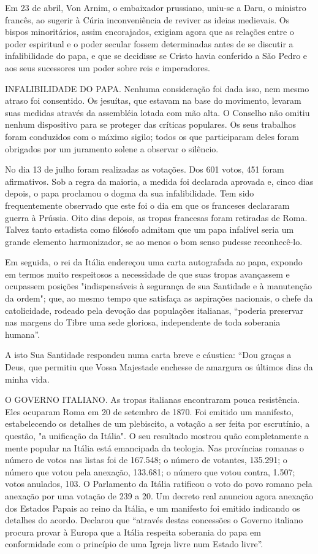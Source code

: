 \documentclass[11pt,a5paper,twoside,openany]{book}
\begin{document}
Em 23 de abril, Von Arnim, o embaixador prussiano, uniu-se a Daru, o ministro francês, ao sugerir à Cúria inconveniência de reviver as ideias medievais. Os bispos minoritários, assim encorajados, exigiam agora que as relações entre o poder espiritual e o poder secular fossem determinadas antes de se discutir a infalibilidade do papa, e que se decidisse se Cristo havia conferido a São Pedro e aos seus sucessores um poder sobre reis e imperadores.

INFALIBILIDADE DO PAPA. Nenhuma consideração foi dada isso, nem mesmo atraso foi consentido. Os jesuítas, que estavam na base do movimento, levaram suas medidas através da assembléia lotada com mão alta. O Conselho não omitiu nenhum dispositivo para se proteger das críticas populares. Os seus trabalhos foram conduzidos com o máximo sigilo; todos os que participaram deles foram obrigados por um juramento solene a observar o silêncio.

No dia 13 de julho foram realizadas as votações. Dos 601 votos, 451 foram afirmativos. Sob a regra da maioria, a medida foi declarada aprovada e, cinco dias depois, o papa proclamou o dogma da sua infalibilidade. Tem sido frequentemente observado que este foi o dia em que os franceses declararam guerra à Prússia. Oito dias depois, as tropas francesas foram retiradas de Roma. Talvez tanto estadista como filósofo admitam que um papa infalível seria um grande elemento harmonizador, se ao menos o bom senso pudesse reconhecê-lo.

Em seguida, o rei da Itália endereçou uma carta autografada ao papa, expondo em termos muito respeitosos a necessidade de que suas tropas avançassem e ocupassem posições "indispensáveis ​​à segurança de sua Santidade e à manutenção da ordem"; que, ao mesmo tempo que satisfaça as aspirações nacionais, o chefe da catolicidade, rodeado pela devoção das populações italianas, “poderia preservar nas margens do Tibre uma sede gloriosa, independente de toda soberania humana”.

A isto Sua Santidade respondeu numa carta breve e cáustica: “Dou graças a Deus, que permitiu que Vossa Majestade enchesse de amargura os últimos dias da minha vida.

O GOVERNO ITALIANO. As tropas italianas encontraram pouca resistência. Eles ocuparam Roma em 20 de setembro de 1870. Foi emitido um manifesto, estabelecendo os detalhes de um plebiscito, a votação a ser feita por escrutínio, a questão, "a unificação da Itália". O seu resultado mostrou quão completamente a mente popular na Itália está emancipada da teologia. Nas províncias romanas o número de votos nas listas foi de 167.548; o número de votantes, 135.291; o número que votou pela anexação, 133.681; o número que votou contra, 1.507; votos anulados, 103. O Parlamento da Itália ratificou o voto do povo romano pela anexação por uma votação de 239 a 20. Um decreto real anunciou agora anexação dos Estados Papais ao reino da Itália, e um manifesto foi emitido indicando os detalhes do acordo. Declarou que “através destas concessões o Governo italiano procura provar à Europa que a Itália respeita soberania do papa em conformidade com o princípio de uma Igreja livre num Estado livre”.
\end{document}
